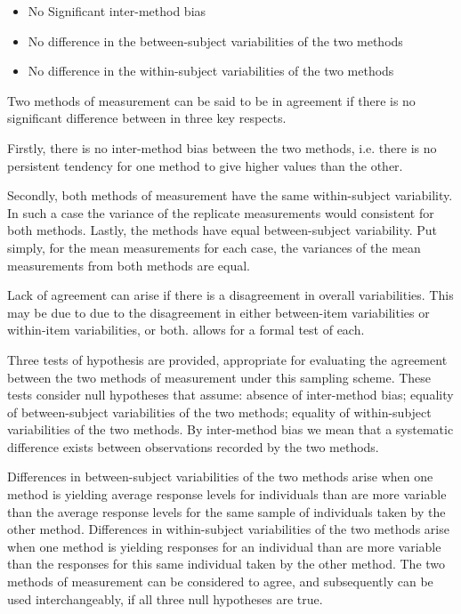 \documentclass[12pt, a4paper]{report}
\theoremstyle{plain}
\theoremstyle{definition}
\theoremstyle{remark}
\begin{document}
\begin{itemize}\itemsep0.5cm
	\item No Significant inter-method bias
	\item No difference in the between-subject variabilities of the two methods
	\item No difference in the within-subject variabilities of the two methods
\end{itemize}




Two methods of measurement can be said to be in agreement if there is no significant difference between in three key respects. 

Firstly, there is no inter-method bias between the two methods, i.e. there is no persistent tendency for one method to give higher values than the other.

Secondly, both methods of measurement have the same  within-subject variability. In such a case the variance of the replicate measurements would consistent for both methods.
Lastly, the methods have equal between-subject variability.  Put simply, for the mean measurements for each case, the variances of the mean measurements from both methods are equal.

Lack of agreement can arise if there is a disagreement in overall variabilities. This may be due to due to the disagreement in either between-item
variabilities or within-item variabilities, or both. \citet{ARoy2009} allows for a formal test of each.

\bigskip

Three tests of hypothesis are provided, appropriate for evaluating the agreement between the two methods of measurement under this sampling scheme. These tests consider null hypotheses that assume: absence of inter-method bias; equality of between-subject variabilities of the two methods; equality of within-subject variabilities of the two methods. By inter-method bias we mean that a systematic difference exists between observations recorded by the two methods. 

Differences in between-subject variabilities of the two methods arise when one method is yielding average response levels for individuals than are more variable than the average response levels for the same sample of individuals taken by the other method.  Differences in within-subject variabilities of the two methods arise when one method is yielding responses for an individual than are more variable than the responses for this same individual taken by the other method. The two methods of measurement can be considered to agree, and subsequently can be used interchangeably, if all three null hypotheses are true.	
\end{document}
